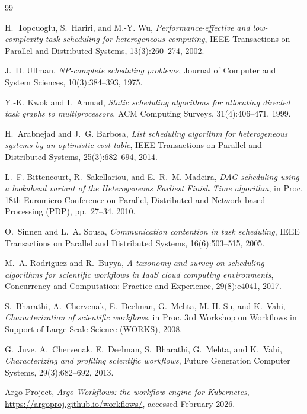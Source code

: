 \documentclass[12pt,a4paper]{report}
\begin{document}
\begin{thebibliography}{99}

H.~Topcuoglu, S.~Hariri, and M.-Y. Wu,
\emph{Performance-effective and low-complexity task scheduling for
heterogeneous computing}, IEEE Transactions on Parallel and Distributed
Systems, 13(3):260--274, 2002.

J.~D. Ullman, \emph{NP-complete scheduling problems}, Journal of Computer
and System Sciences, 10(3):384--393, 1975.

Y.-K. Kwok and I.~Ahmad, \emph{Static scheduling algorithms for allocating
directed task graphs to multiprocessors}, ACM Computing Surveys,
31(4):406--471, 1999.

H.~Arabnejad and J.~G. Barbosa, \emph{List scheduling algorithm for
heterogeneous systems by an optimistic cost table}, IEEE Transactions on
Parallel and Distributed Systems, 25(3):682--694, 2014.

L.~F. Bittencourt, R.~Sakellariou, and E.~R.~M. Madeira, \emph{DAG
scheduling using a lookahead variant of the Heterogeneous Earliest Finish
Time algorithm}, in Proc. 18th Euromicro Conference on Parallel,
Distributed and Network-based Processing (PDP), pp.~27--34, 2010.

O.~Sinnen and L.~A. Sousa, \emph{Communication contention in task
scheduling}, IEEE Transactions on Parallel and Distributed Systems,
16(6):503--515, 2005.

M.~A. Rodriguez and R.~Buyya, \emph{A taxonomy and survey on scheduling
algorithms for scientific workflows in IaaS cloud computing
environments}, Concurrency and Computation: Practice and Experience,
29(8):e4041, 2017.

S.~Bharathi, A.~Chervenak, E.~Deelman, G.~Mehta, M.-H. Su, and K.~Vahi,
\emph{Characterization of scientific workflows}, in Proc. 3rd Workshop on
Workflows in Support of Large-Scale Science (WORKS), 2008.

G.~Juve, A.~Chervenak, E.~Deelman, S.~Bharathi, G.~Mehta, and K.~Vahi,
\emph{Characterizing and profiling scientific workflows}, Future
Generation Computer Systems, 29(3):682--692, 2013.

Argo Project, \emph{Argo Workflows: the workflow engine for Kubernetes},
\url{https://argoproj.github.io/workflows/}, accessed February 2026.


\end{thebibliography}
\end{document}
